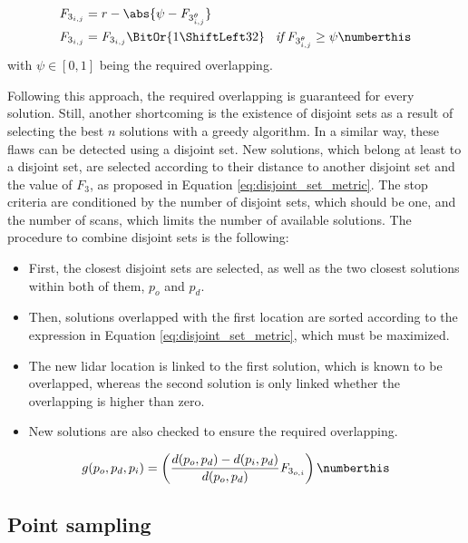 \begin{align*}
    \textit{F}_{3_{i, j}} &= r - \abs{\psi - \textit{F}_{3_{i, j}^\theta}}\\
    \textit{F}_{3_{i, j}} &= \textit{F}_{3_{i, j}} \BitOr{1 \ShiftLeft 32} \hspace{3mm} \textit{if} \hspace{1mm}  \textit{F}_{3_{i, j}^\theta} \geq \psi
    \numberthis \label{eq:loo}
\end{align*}
with $\psi \in [0, 1]$ being the required overlapping.

Following this approach, the required overlapping is guaranteed for every solution. Still, another shortcoming is the existence of disjoint sets as a result of selecting the best $n$ solutions with a greedy algorithm. In a similar way, these flaws can be detected using a disjoint set. New solutions, which belong at least to a disjoint set, are selected according to their distance to another disjoint set and the value of $F_3$, as proposed in Equation \ref{eq:disjoint_set_metric}. The stop criteria are conditioned by the number of disjoint sets, which should be one, and the number of scans, which limits the number of available solutions. The procedure to combine disjoint sets is the following:
\begin{itemize}
    \item First, the closest disjoint sets are selected, as well as the two closest solutions within both of them, $p_o$ and $p_d$.
    \item Then, solutions overlapped with the first location are sorted according to the expression in Equation \ref{eq:disjoint_set_metric}, which must be maximized. 
    \item The new \acrshort{lidar} location is linked to the first solution, which is known to be overlapped, whereas the second solution is only linked whether the overlapping is higher than zero. 
    \item New solutions are also checked to ensure the required overlapping.
\end{itemize}
\begin{align*}
    g(p_o, p_d, p_i) = \left(\frac{d(p_o, p_d) - d(p_i, p_d)}{d(p_o, p_d)} \textit{F}_{3_{o, i}}\right)
    \numberthis \label{eq:disjoint_set_metric}
\end{align*}

\subsection{Point sampling}

